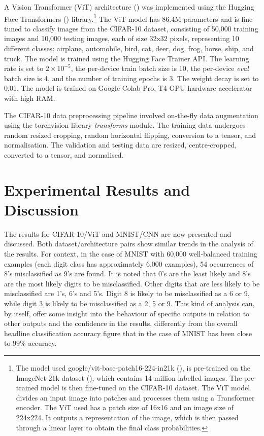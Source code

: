 A Vision Transformer (ViT) architecture (\cite{dosovitskiy2020image}) was implemented using the Hugging Face Transformers (\cite{wolf2020huggingfaces})
library.\footnote{The model used google/vit-base-patch16-224-in21k (\cite{wu2020visual}), is pre-trained on the ImageNet-21k dataset (\cite{deng2009imagenet}), which contains 14 million labelled images. The pre-trained model is then fine-tuned on the CIFAR-10 dataset.
The ViT model divides an input image into patches and processes them using a Transformer encoder. The ViT used has a patch size of 16x16 and an image size of 224x224. It outputs a representation of the image, which is then passed through a linear layer to obtain the final class probabilities.} The ViT model has 86.4M parameters and is fine-tuned to classify images from the CIFAR-10 dataset, consisting of 50,000 training images and 10,000 testing images, each of size 32x32 pixels, representing 10 different classes: airplane, automobile, bird, cat, deer, dog, frog, horse, ship, and truck. The model is trained using the Hugging Face Trainer API. The learning rate is set to $2 \times 10^{-5}$, the per-device train batch size is 10, the per-device \textit{eval} batch size is 4, and the number of training epochs is 3. The weight decay is set to 0.01. The model is trained on Google Colab Pro, T4 GPU hardware accelerator with high RAM.

The CIFAR-10 data preprocessing pipeline involved on-the-fly data augmentation using the torchvision library \textit{transforms} module. The training data undergoes random resized cropping, random horizontal flipping, conversion to a tensor, and normalisation. The validation and testing data are resized, centre-cropped, converted to a tensor, and normalised. 


\section{Experimental Results and Discussion}

The results for CIFAR-10/ViT and MNIST/CNN are now presented and discussed. Both dataset/architecture pairs show similar trends in the analysis of the results. For context, in the case of MNIST with 60,000 well-balanced training examples (each digit class has approximately 6,000 examples), 54 occurrences of 8's misclassified as 9's are found. It is noted that 0's are the least likely and 8's are the most likely digits to be misclassified. Other digits that are less likely to be misclassified are 1's, 6's and 5's. Digit 8 is likely to be misclassified as a 6 or 9, while digit 3 is likely to be misclassified as a 2, 5 or 9. This kind of analysis can, by itself, offer some insight into the behaviour of specific outputs in relation to other outputs and the confidence in the results, differently from the overall headline classification accuracy figure that in the case of MNIST has been close to $99\%$ accuracy. 

